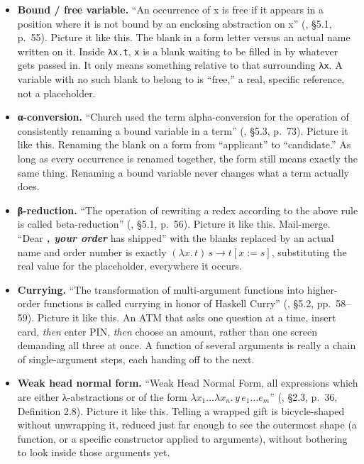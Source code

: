 \begin{itemize}
\tightlist
\item
  \textbf{Bound / free variable.} ``An occurrence of x is free if it appears in a position where it is not bound by an enclosing abstraction on x'' (\cite{Pierce2002}, §5.1, p.~55). Picture it like this. The blank in a form letter versus an actual name written on it. Inside \texttt{λx.t}, \texttt{x} is a blank waiting to be filled in by whatever gets passed in. It only means something relative to that surrounding \texttt{λx}. A variable with no such blank to belong to is ``free,'' a real, specific reference, not a placeholder.
\item
  \textbf{α-conversion.} ``Church used the term alpha-conversion for the operation of consistently renaming a bound variable in a term'' (\cite{Pierce2002}, §5.3, p.~73). Picture it like this. Renaming the blank on a form from ``applicant'' to ``candidate.'' As long as every occurrence is renamed together, the form still means exactly the same thing. Renaming a bound variable never changes what a term actually does.
\item
  \textbf{β-reduction.} ``The operation of rewriting a redex according to the above rule is called beta-reduction'' (\cite{Pierce2002}, §5.1, p.~56). Picture it like this. Mail-merge. ``Dear \textbf{\emph{, your order }} has shipped'' with the blanks replaced by an actual name and order number is exactly \((\lambda x.\, t)\, s \to t[x := s]\), substituting the real value for the placeholder, everywhere it occurs.
\item
  \textbf{Currying.} ``The transformation of multi-argument functions into higher-order functions is called currying in honor of Haskell Curry'' (\cite{Pierce2002}, §5.2, pp.~58--59). Picture it like this. An ATM that asks one question at a time, insert card, \emph{then} enter PIN, \emph{then} choose an amount, rather than one screen demanding all three at once. A function of several arguments is really a chain of single-argument steps, each handing off to the next.
\item
  \textbf{Weak head normal form.} ``Weak Head Normal Form, all expressions which are either λ-abstractions or of the form \(\lambda x_1 \ldots \lambda x_n.\, y\, e_1 \ldots e_m\)'' (\cite{Thompson1991}, §2.3, p.~36, Definition 2.8). Picture it like this. Telling a wrapped gift is bicycle-shaped without unwrapping it, reduced just far enough to see the outermost shape (a function, or a specific constructor applied to arguments), without bothering to look inside those arguments yet.

\end{itemize}

